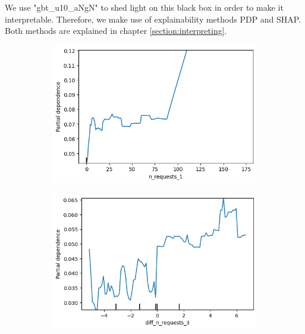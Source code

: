 \documentclass[12pt,titlepage]{article}
\begin{document}
We use "gbt\_u10\_aNgN" to shed light on this black box in order to make it interpretable. Therefore, we make use of explainability methods PDP and SHAP. Both methods are explained in chapter \ref{section:interpreting}. \\
\noindent
\begin{figure}[h!]
\centering
    \begin{subfigure}{.55\textwidth}
      \centering
      \includegraphics[width=1\linewidth]{pdp_n_requests_1.png}
    \end{subfigure}%
    \begin{subfigure}{.55\textwidth}
      \centering
      \includegraphics[width=1\linewidth]{pdp_diff_n_requests_3.png}
    \end{subfigure} \\
    \begin{subfigure}{.55\textwidth}
        \centering

\end{subfigure}
\end{figure}
\end{document}
